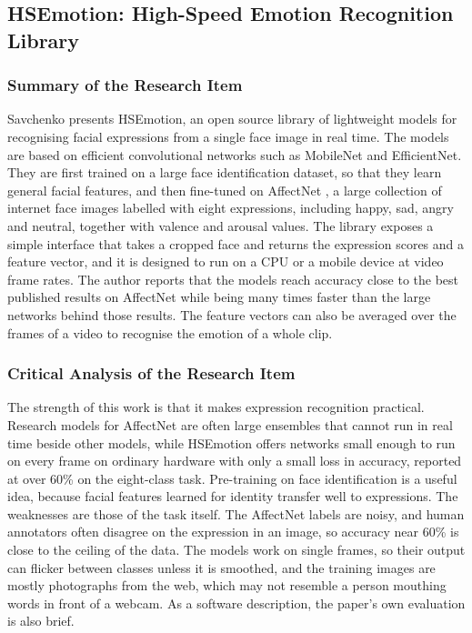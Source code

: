 \documentclass{FastFyp}
\begin{document}
\subsection{HSEmotion: High-Speed Emotion Recognition Library}
\subsubsection*{Summary of the Research Item}
Savchenko \cite{savchenko2022hsemotion} presents HSEmotion, an open source library of lightweight models for recognising facial expressions from a single face image in real time. The models are based on efficient convolutional networks such as MobileNet and EfficientNet. They are first trained on a large face identification dataset, so that they learn general facial features, and then fine-tuned on AffectNet \cite{mollahosseini2019affectnet}, a large collection of internet face images labelled with eight expressions, including happy, sad, angry and neutral, together with valence and arousal values. The library exposes a simple interface that takes a cropped face and returns the expression scores and a feature vector, and it is designed to run on a CPU or a mobile device at video frame rates. The author reports that the models reach accuracy close to the best published results on AffectNet \cite{mollahosseini2019affectnet} while being many times faster than the large networks behind those results. The feature vectors can also be averaged over the frames of a video to recognise the emotion of a whole clip.

\subsubsection*{Critical Analysis of the Research Item}
The strength of this work is that it makes expression recognition practical. Research models for AffectNet are often large ensembles that cannot run in real time beside other models, while HSEmotion offers networks small enough to run on every frame on ordinary hardware with only a small loss in accuracy, reported at over 60\% on the eight-class task. Pre-training on face identification is a useful idea, because facial features learned for identity transfer well to expressions. The weaknesses are those of the task itself. The AffectNet labels are noisy, and human annotators often disagree on the expression in an image, so accuracy near 60\% is close to the ceiling of the data. The models work on single frames, so their output can flicker between classes unless it is smoothed, and the training images are mostly photographs from the web, which may not resemble a person mouthing words in front of a webcam. As a software description, the paper's own evaluation is also brief.
\end{document}
